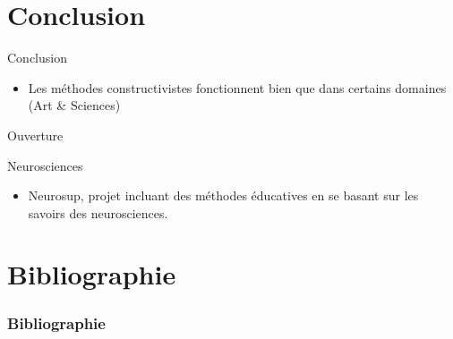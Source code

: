 \section{Conclusion}

\begin{frame}{Conclusion}
  \begin{itemize}
    \item Les méthodes constructivistes fonctionnent bien que dans certains domaines (Art \& Sciences)
  \end{itemize}
\end{frame}

\begin{frame}{Ouverture}
  \begin{block}{Neurosciences}
    \begin{itemize}
      \item Neurosup, projet incluant des méthodes éducatives en se basant sur les savoirs des neurosciences.
    \end{itemize}
  \end{block}
\end{frame}

\section*{Bibliographie}

\begin{frame}[allowframebreaks]
\frametitle{Bibliographie}

\end{frame}